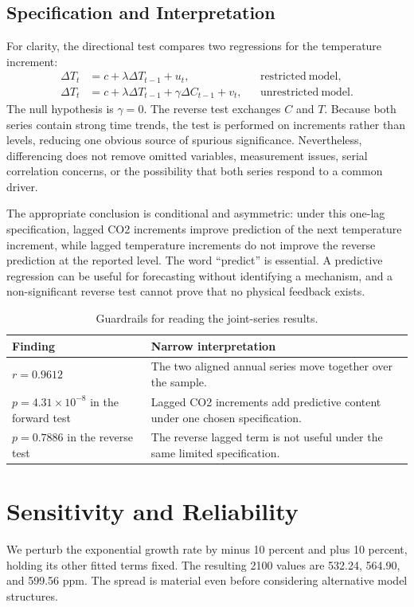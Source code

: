 \documentclass{mcmthesis}
\begin{document}
\subsection{Specification and Interpretation}
For clarity, the directional test compares two regressions for the temperature increment:
\begin{align}
 \Delta T_t&=c+\lambda\Delta T_{t-1}+u_t, &&\mathrm{restricted\ model},\\
 \Delta T_t&=c+\lambda\Delta T_{t-1}+\gamma\Delta C_{t-1}+v_t, &&\mathrm{unrestricted\ model}.
\end{align}
The null hypothesis is $\gamma=0$. The reverse test exchanges $C$ and $T$. Because both series contain strong time trends, the test is performed on increments rather than levels, reducing one obvious source of spurious significance. Nevertheless, differencing does not remove omitted variables, measurement issues, serial correlation concerns, or the possibility that both series respond to a common driver.

The appropriate conclusion is conditional and asymmetric: under this one-lag specification, lagged CO2 increments improve prediction of the next temperature increment, while lagged temperature increments do not improve the reverse prediction at the reported level. The word ``predict'' is essential. A predictive regression can be useful for forecasting without identifying a mechanism, and a non-significant reverse test cannot prove that no physical feedback exists.

\begin{table}[H]
\centering
\small
\caption{Guardrails for reading the joint-series results.}
\begin{tabularx}{\textwidth}{lX}
\toprule
Finding & Narrow interpretation \\
\midrule
$r=0.9612$ & The two aligned annual series move together over the sample. \\
$p=4.31\times10^{-8}$ in the forward test & Lagged CO2 increments add predictive content under one chosen specification. \\
$p=0.7886$ in the reverse test & The reverse lagged term is not useful under the same limited specification. \\
\bottomrule
\end{tabularx}
\end{table}

\section{Sensitivity and Reliability}
We perturb the exponential growth rate by minus 10 percent and plus 10 percent, holding its other fitted terms fixed. The resulting 2100 values are 532.24, 564.90, and 599.56 ppm. The spread is material even before considering alternative model structures.
\end{document}
